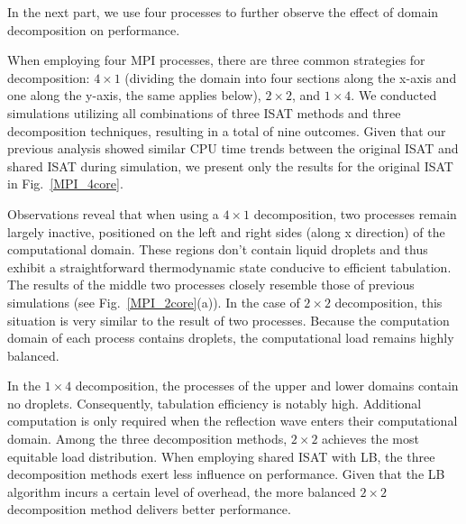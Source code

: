 In the next part, we use four processes to further observe the effect of domain decomposition on performance.


When employing four MPI processes, there are three common strategies for decomposition: $4\times1$ (dividing the domain into four sections along the x-axis and one along the y-axis, the same applies below), $2\times2$, and $1\times4$. We conducted simulations utilizing all combinations of three ISAT methods and three decomposition techniques, resulting in a total of nine outcomes. Given that our previous analysis showed similar CPU time trends between the original ISAT and shared ISAT during simulation, we present only the results for the original ISAT in Fig.~\ref{MPI_4core}.

Observations reveal that when using a $4\times1$ decomposition, two processes remain largely inactive, positioned on the left and right sides (along x direction) of the computational domain. These regions don't contain liquid droplets and thus exhibit a straightforward thermodynamic state conducive to efficient tabulation. The results of the middle two processes closely resemble those of previous simulations (see Fig.~\ref{MPI_2core}(a)). In the case of $2\times2$ decomposition, this situation is very similar to the result of two processes. Because the computation domain of each process contains droplets, the computational load remains highly balanced.

In the $1\times4$ decomposition, the processes of the upper and lower domains contain no droplets. Consequently, tabulation efficiency is notably high. Additional computation is only required when the reflection wave enters their computational domain. Among the three decomposition methods, $2\times2$ achieves the most equitable load distribution. When employing shared ISAT with LB, the three decomposition methods exert less influence on performance. Given that the LB algorithm incurs a certain level of overhead, the more balanced $2\times2$ decomposition method delivers better performance.

